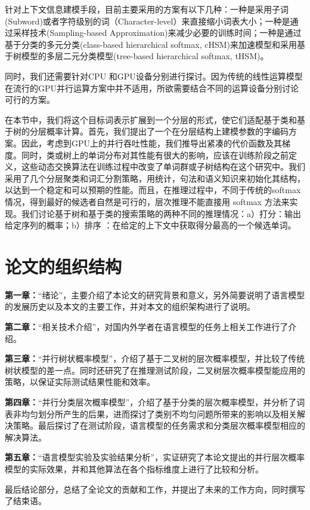 针对上下文信息建模手段，目前主要采用的方案有以下几种：一种是采用子词(Subword)或者字符级别的词（Character-level）来直接缩小词表大小；一种是通过采样技术(Sampling-based Approximation)来减少必要的训练时间；一种是通过基于分类的多元分类(class-based hierarchical softmax, cHSM)来加速模型和采用基于树模型的多层二元分类模型(tree-based hierarchical softmax, tHSM)。

同时，我们还需要针对CPU 和GPU设备分别进行探讨。因为传统的线性运算模型在流行的GPU并行运算方案中并不适用，所欲需要结合不同的运算设备分别讨论可行的方案。

在本节中，我们将这个目标词表示扩展到一个分层的形式，使它们适配基于类和基于树的分层概率计算。首先，我们提出了一个在分层结构上建模参数的字编码方案。因此，考虑到GPU上的并行吞吐性能，我们推导出紧凑的代价函数及其梯度。同时，类或树上的单词分布对其性能有很大的影响，应该在训练阶段之前定义，这些动态交换算法在训练过程中改变了单词群或子树结构在这个研究中。我们采用了几个分层聚类和词汇分割策略，用统计，句法和语义知识来初始化其结构，以达到一个稳定和可以预期的性能。而且，在推理过程中，不同于传统的softmax情况，得到最好的候选者自然是可行的，层次推理不能直接用 softmax 方法来实现。我们讨论基于树和基于类的搜索策略的两种不同的推理情况：a）打分：输出给定序列的概率；b）排序   ：在给定的上下文中获取得分最高的一个候选单词。
\section{论文的组织结构}
\textbf{第一章：}``绪论''，主要介绍了本论文的研究背景和意义，另外简要说明了语言模型的发展历史以及本文的主要工作，并对本文的组织架构进行了说明。

\textbf{第二章：}``相关技术介绍''，对国内外学者在语言模型的任务上相关工作进行了介绍。

\textbf{第三章：}``并行树状概率模型''，介绍了基于二叉树的层次概率模型，并比较了传统树状模型的差一点。同时还研究了在推理测试阶段，二叉树层次概率模型能应用的策略，以保证实际测试结果性能和效率。


\textbf{第四章：}``并行分类层次概率模型''，介绍了基于分类的层次概率模型，并分析了词表非均匀划分所产生的后果，进而探讨了类别不均匀问题所带来的影响以及相关解决策略。最后探讨了在测试阶段，语言模型的任务需求和分类层次概率模型相应的解决算法。

\textbf{第五章：}``语言模型实验及实验结果分析''，实证研究了本论文提出的并行层次概率模型的实际效果，并和其他算法在各个指标维度上进行了比较和分析。

最后结论部分，总结了全论文的贡献和工作，并提出了未来的工作方向，同时撰写了结束语。



